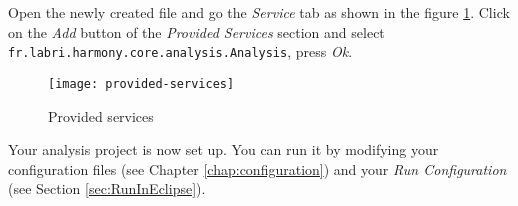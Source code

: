 Open the newly created file and go the \emph{Service} tab as shown in the figure \ref{fig:provided-services}. Click on the \emph{Add} button of the \emph{Provided Services} section and select \texttt{fr.labri.harmony.core.analysis.Analysis}, press \emph{Ok}.
	
	\begin{figure}[H]
		\centering
		\texttt{[image: provided-services]}
		\caption{Provided services}
		\label{fig:provided-services}
	\end{figure}
	
Your analysis project is now set up. You can run it by modifying your configuration files (see Chapter \ref{chap:configuration}) and your \emph{Run Configuration} (see Section \ref{sec:RunInEclipse}).